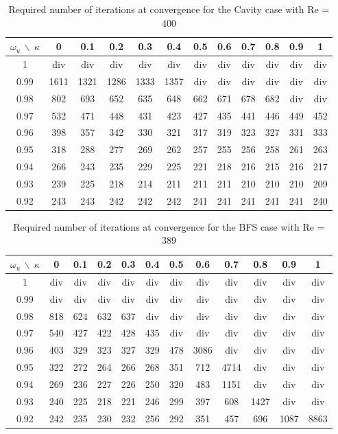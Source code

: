 \documentclass[final,3p,times,11pt,onecolumn]{myElsarticle}
\numberwithin{equation}{section}
\begin{document}
\begin{table}[b!!!!]
\centering
\begin{tabular}{c|ccccccccccc}
\hline 
$\omega_u\,\backslash\:\kappa$ & 0 & 0.1 & 0.2 & 0.3 & 0.4 & 0.5 & 0.6 & 0.7 & 0.8 & 0.9 & 1 \\ 
\hline 
1 & div & div & div & div & div & div & div & div & div & div & div \\ 
0.99 & 1611 & 1321 & 1286 & 1333 & 1357 & div & div & div & div & div & div \\ 
0.98 & 802 & 693 & 652 & 635 & 648 & 662 & 671 & 678 & 682 & div & div \\ 
0.97 & 532 & 471 & 448 & 431 & 423 & 427 & 435 & 441 & 446 & 449 & 452 \\ 
0.96 & 398 & 357 & 342 & 330 & 321 & 317 & 319 & 323 & 327 & 331 & 333 \\ 
0.95 & 318 & 288 & 277 & 269 & 262 & 257 & 255 & 256 & 258 & 261 & 263 \\ 
0.94 & 266 & 243 & 235 & 229 & 225 & 221 & 218 & 216 & 215 & 216 & 217 \\ 
0.93 & 239 & 225 & 218 & 214 & 211 & 211 & 211 & 210 & 210 & 210 & 209 \\ 
0.92 & 243 & 243 & 242 & 242 & 242 & 241 & 241 & 241 & 241 & 241 & 240 \\ 
\hline 
\end{tabular}
\caption{Required number of iterations at convergence for the Cavity case with Re = 400}
\label{Table:Cavity_HighRe}
\end{table}
\begin{table}[t!!!!]
\centering
\begin{tabular}{c|ccccccccccc}
\hline 
$\omega_u\,\backslash\:\kappa$ & 0 & 0.1 & 0.2 & 0.3 & 0.4 & 0.5 & 0.6 & 0.7 & 0.8 & 0.9 & 1 \\ 
\hline 
1 & div & div & div & div & div & div & div & div & div & div & div \\ 
0.99 & div & div & div & div & div & div & div & div & div & div & div \\ 
0.98 & 818 & 624 & 632 & 637 & div & div & div & div & div & div & div \\ 
0.97 & 540 & 427 & 422 & 428 & 435 & div & div & div & div & div & div \\ 
0.96 & 403 & 329 & 323 & 327 & 329 & 478 & 3086 & div & div & div & div \\ 
0.95 & 322 & 272 & 264 & 266 & 268 & 351 & 712 & 4714 & div & div & div \\ 
0.94 & 269 & 236 & 227 & 226 & 250 & 320 & 483 & 1151 & div & div & div \\ 
0.93 & 240 & 225 & 218 & 221 & 246 & 299 & 397 & 608 & 1427 & div & div \\ 
0.92 & 242 & 235 & 230 & 232 & 256 & 292 & 351 & 457 & 696 & 1087 & 8863 \\ 
\hline 
\end{tabular}
\caption{Required number of iterations at convergence for the BFS case with Re = 389}
\label{Table:BFS_HighRe}
\end{table}
\end{document}
